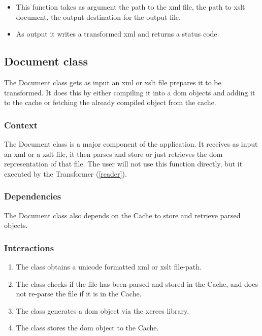 \begin{itemize}
  \item This function takes as argument the path to the \gls{xml} file, the path to \gls{xslt} document, the output destination for the output file.
  \item As output it writes a transformed \gls{xml} and returns a status code.
\end{itemize}

\subsection{Document class}
\label{document}
\label{parser}

The Document class gets as input an \gls{xml} or \gls{xslt} file prepares it to be transformed.
It does this by either compiling it into a \gls{dom} objects and adding it to the cache or fetching the already compiled object from the cache.

\subsubsection{Context}

The Document class is a major component of the application.
It receives as input an \gls{xml} or a \gls{xslt} file, it then parses and store or just retrieves the \gls{dom} representation of that file.
The user will not use this function directly, but it executed by the Transformer (\ref{reader}).

\subsubsection{Dependencies}

The Document class also depends on the Cache to store and retrieve parsed objects.

\subsubsection{Interactions}

\begin{enumerate}
\item The class obtains a \gls{unicode} formatted \gls{xml} or \gls{xslt} file-path.
\item The class checks if the file has been parsed and stored in the Cache, and does not re-parse the file if it is in the Cache.
\item The class generates a \gls{dom} object via the \gls{xerces} library.
\item The class stores the \gls{dom} object to the Cache.
\end{enumerate}

